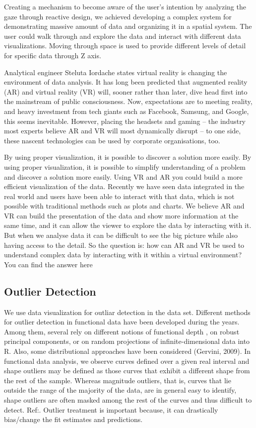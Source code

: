 \documentclass[]{book}
\theoremstyle{definition}
\theoremstyle{definition}
\theoremstyle{definition}
\theoremstyle{remark}
\begin{document}
Creating a mechanism to become aware of the user's intention by
analyzing the gaze through reactive design, we achieved developing a
complex system for demonstrating massive amount of data and organizing
it in a spatial system. The user could walk through and explore the data
and interact with different data visualizations. Moving through space is
used to provide different levels of detail for specific data through Z
axis.

Analytical engineer Steluta Iordache states virtual reality is changing
the environment of data analysis. It has long been predicted that
augmented reality (AR) and virtual reality (VR) will, sooner rather than
later, dive head first into the mainstream of public consciousness. Now,
expectations are to meeting reality, and heavy investment from tech
giants such as Facebook, Samsung, and Google, this seems inevitable.
However, placing the headsets and gaming -- the industry most experts
believe AR and VR will most dynamically disrupt -- to one side, these
nascent technologies can be used by corporate organisations, too.

By using proper visualization, it is possible to discover a solution
more easily. By using proper visualization, it is possible to simplify
understanding of a problem and discover a solution more easily. Using VR
and AR you could build a more efficient visualization of the data.
Recently we have seen data integrated in the real world and users have
been able to interact with that data, which is not possible with
traditional methods such as plots and charts. We believe AR and VR can
build the presentation of the data and show more information at the same
time, and it can allow the viewer to explore the data by interacting
with it. But when we analyse data it can be difficult to see the big
picture while also having access to the detail. So the question is: how
can AR and VR be used to understand complex data by interacting with it
within a virtual environment? You can find the answer
here\citep{vr_education}

\subsection{Outlier Detection}\label{outlier-detection}

\citep{outliar}

We use data visualization for outliar detection in the data set.
Different methods for outlier detection in functional data have been
developed during the years. Among them, several rely on different
notions of functional depth , on robust principal components, or on
random projections of infinite-dimensional data into R. Also, some
distributional approaches have been considered (Gervini, 2009). In
functional data analysis, we observe curves defined over a given real
interval and shape outliers may be defined as those curves that exhibit
a different shape from the rest of the sample. Whereas magnitude
outliers, that is, curves that lie outside the range of the majority of
the data, are in general easy to identify, shape outliers are often
masked among the rest of the curves and thus difficult to detect.
Ref:\citep{outliar}. Outlier treatment is important because, it can
drastically bias/change the fit estimates and predictions.
\end{document}
